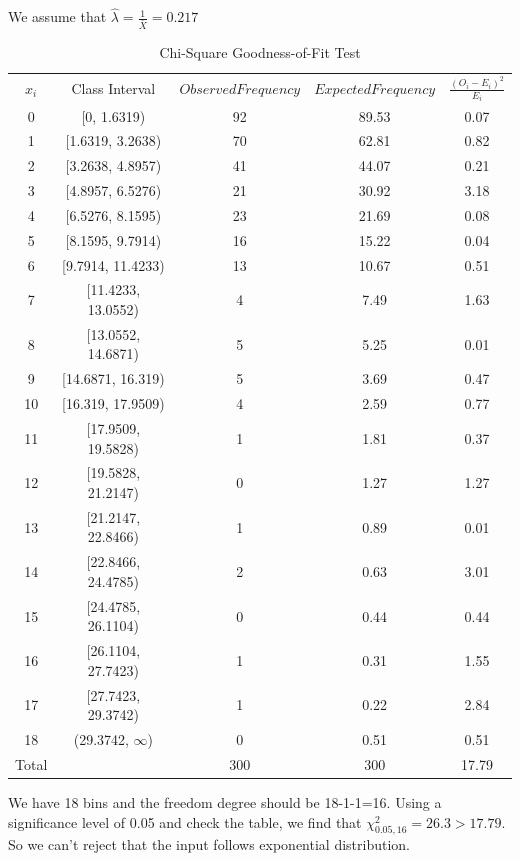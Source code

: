 \documentclass{article}
\begin{document}
We assume that $\hat{\lambda}=\frac{1}{\bar{X}}=0.217$
\begin{table}[htp]
\caption{Chi-Square Goodness-of-Fit Test}
\begin{center}
\begin{tabular}{ccccc}
\hline
$x_i$ & Class Interval & $Observed Frequency$ & $Expected Frequency$ & $\frac{(O_i-E_i)^2}{E_i}$\\
0&[0, 1.6319)&92&89.53&0.07\\
1&[1.6319, 3.2638)&70&62.81&0.82\\
2&[3.2638, 4.8957)&41&44.07&0.21\\
3&[4.8957, 6.5276)&21&30.92&3.18\\
4&[6.5276, 8.1595)&23&21.69&0.08\\
5&[8.1595, 9.7914)&16&15.22&0.04\\
6&[9.7914, 11.4233)&13&10.67&0.51\\
7&[11.4233, 13.0552)&4&7.49&1.63\\
8&[13.0552, 14.6871)&5&5.25&0.01\\
9&[14.6871, 16.319)&5&3.69&0.47\\
10&[16.319, 17.9509)&4&2.59&0.77\\
11&[17.9509, 19.5828)&1&1.81&0.37\\
12&[19.5828, 21.2147)&0&1.27&1.27\\
13&[21.2147, 22.8466)&1&0.89&0.01\\
14&[22.8466, 24.4785)&2&0.63&3.01\\
15&[24.4785, 26.1104)&0&0.44&0.44\\
16&[26.1104, 27.7423)&1&0.31&1.55\\
17&[27.7423, 29.3742)&1&0.22&2.84\\
18&(29.3742, $\infty$)&0&0.51&0.51\\
\hline
Total& &300&300&17.79\\

\hline

\end{tabular}
\end{center}
\label{default}
\end{table}%

We have 18 bins and the freedom degree should be 18-1-1=16. Using a significance level of 0.05 and check the table, we find that $\chi^2_{0.05, 16}=26.3 > 17.79$. So we can't reject that the input follows exponential distribution.
\end{document}
